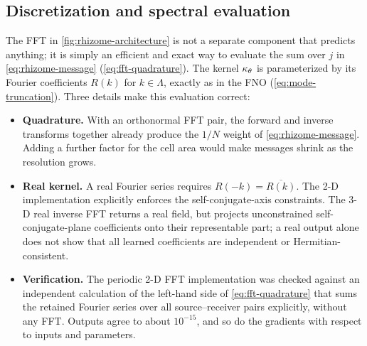\subsection{Discretization and spectral evaluation}
\label{sec:rhizome-discretisation}

The FFT in \cref{fig:rhizome-architecture} is not a separate component that predicts anything; it is simply an efficient and exact way to evaluate the sum over $j$ in \cref{eq:rhizome-message} (\cref{eq:fft-quadrature}). The kernel $\kappa_\theta$ is parameterized by its Fourier coefficients $R(k)$ for $k\in\Lambda$, exactly as in the FNO (\cref{eq:mode-truncation}). Three details make this evaluation correct:
\begin{itemize}
  \item \textbf{Quadrature.} With an orthonormal FFT pair, the forward and inverse transforms together already produce the $1/N$ weight of \cref{eq:rhizome-message}. Adding a further factor for the cell area would make messages shrink as the resolution grows.
  \item \textbf{Real kernel.} A real Fourier series requires $R(-k)=\overline{R(k)}$. The 2-D implementation explicitly enforces the self-conjugate-axis constraints. The 3-D real inverse FFT returns a real field, but projects unconstrained self-conjugate-plane coefficients onto their representable part; a real output alone does not show that all learned coefficients are independent or Hermitian-consistent.
  \item \textbf{Verification.} The periodic 2-D FFT implementation was checked against an independent calculation of the left-hand side of \cref{eq:fft-quadrature} that sums the retained Fourier series over all source--receiver pairs explicitly, without any FFT. Outputs agree to about $10^{-15}$, and so do the gradients with respect to inputs and parameters.
\end{itemize}

